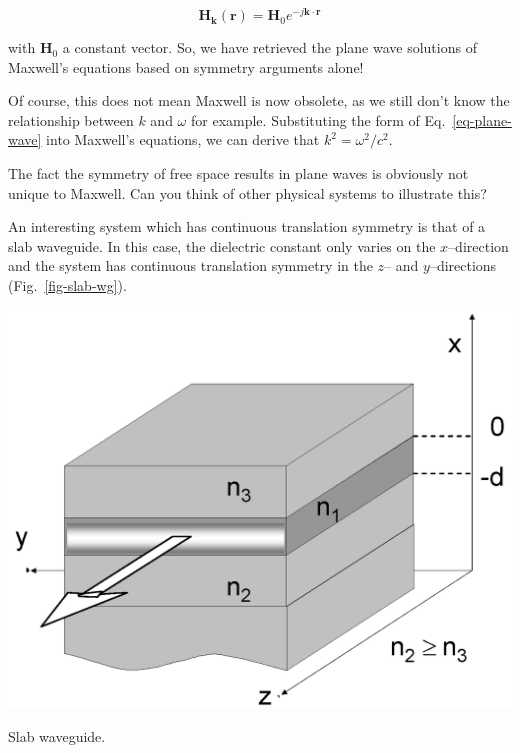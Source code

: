 \begin{equation}
{\mathbf H}_{\mathbf k}({\mathbf r}) = {\mathbf H}_0 e^{-j {\mathbf k} \cdot {\mathbf r}} \label{eq-plane-wave}
\end{equation} 

with ${\mathbf H}_0$ a constant vector. So, we have retrieved the plane wave solutions of Maxwell's equations based on symmetry arguments alone!

Of course, this does not mean Maxwell is now obsolete, as we still don't know the relationship between $k$ and $\omega$ for example. Substituting the form of Eq.~\ref{eq-plane-wave} into Maxwell's equations, we can derive that $k^2 = \omega^2 / c^2$.

\begin{cue}
The fact the symmetry of free space results in plane waves is obviously not unique to Maxwell. Can you think of other physical systems to illustrate this?
\end{cue}


\pagebreak


An interesting system which has continuous translation symmetry is that of a slab waveguide. In this case, the dielectric constant only varies on the $x$--direction and the system has continuous translation symmetry in the $z$-- and $y$--directions (Fig.~\ref{fig-slab-wg}). 

\begin{marginfigure}
\centering
\includegraphics{symmetry/figures/slabwg}
\caption{Slab waveguide.}
\label{fig-slab-wg}
\end{marginfigure}

